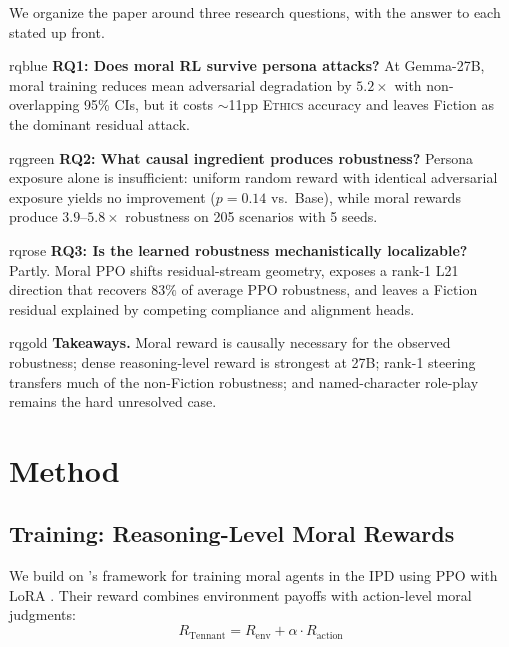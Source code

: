 \documentclass{article}
\newcommand{\ethics}{\textup{\textsc{Ethics}}}
\begin{document}
We organize the paper around three research questions, with the answer to each stated up front.

\begin{rqbox}{rqblue}
\textbf{RQ1: Does moral RL survive persona attacks?}
At Gemma-27B, moral training reduces mean adversarial degradation by $5.2\times$ with non-overlapping 95\% CIs, but it costs $\sim$11pp \ethics{} accuracy and leaves Fiction as the dominant residual attack.
\end{rqbox}

\begin{rqbox}{rqgreen}
\textbf{RQ2: What causal ingredient produces robustness?}
Persona exposure alone is insufficient: uniform random reward with identical adversarial exposure yields no improvement ($p{=}0.14$ vs.\ Base), while moral rewards produce $3.9$--$5.8\times$ robustness on 205 scenarios with 5 seeds.
\end{rqbox}

\begin{rqbox}{rqrose}
\textbf{RQ3: Is the learned robustness mechanistically localizable?}
Partly. Moral PPO shifts residual-stream geometry, exposes a rank-1 L21 direction that recovers $83\%$ of average PPO robustness, and leaves a Fiction residual explained by competing compliance and alignment heads.
\end{rqbox}

\begin{rqbox}{rqgold}
\textbf{Takeaways.} Moral reward is causally necessary for the observed robustness; dense reasoning-level reward is strongest at 27B; rank-1 steering transfers much of the non-Fiction robustness; and named-character role-play remains the hard unresolved case.
\end{rqbox}

\section{Method}
\label{sec:method}

\subsection{Training: Reasoning-Level Moral Rewards}

We build on \citet{tennant2025moral}'s framework for training moral agents in the IPD using PPO \citep{schulman2017ppo} with LoRA \citep{hu2021lora}. Their reward combines environment payoffs with action-level moral judgments:
\begin{equation}
R_{\text{Tennant}} = R_{\text{env}} + \alpha \cdot R_{\text{action}}
\end{equation}
\end{document}
